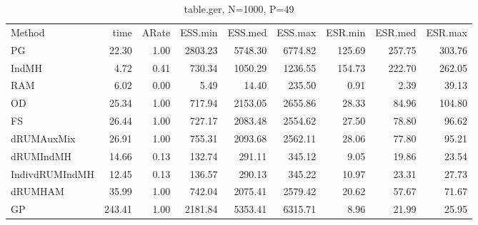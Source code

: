 \begin{table}
\label{tab:blogit-ger}
\begin{tabular}{l r r r r r r r r } 
          Method  &     time &    ARate &  ESS.min &  ESS.med &  ESS.max &  ESR.min &  ESR.med &  ESR.max \\ 
              PG  &    22.30 &     1.00 &  2803.23 &  5748.30 &  6774.82 &   125.69 &   257.75 &   303.76 \\ 
           IndMH  &     4.72 &     0.41 &   730.34 &  1050.29 &  1236.55 &   154.73 &   222.70 &   262.05 \\ 
             RAM  &     6.02 &     0.00 &     5.49 &    14.40 &   235.50 &     0.91 &     2.39 &    39.13 \\ 
              OD  &    25.34 &     1.00 &   717.94 &  2153.05 &  2655.86 &    28.33 &    84.96 &   104.80 \\ 
              FS  &    26.44 &     1.00 &   727.17 &  2083.48 &  2554.62 &    27.50 &    78.80 &    96.62 \\ 
      dRUMAuxMix  &    26.91 &     1.00 &   755.31 &  2093.68 &  2562.11 &    28.06 &    77.80 &    95.21 \\ 
       dRUMIndMH  &    14.66 &     0.13 &   132.74 &   291.11 &   345.12 &     9.05 &    19.86 &    23.54 \\ 
  IndivdRUMIndMH  &    12.45 &     0.13 &   136.57 &   290.13 &   345.22 &    10.97 &    23.31 &    27.73 \\ 
         dRUMHAM  &    35.99 &     1.00 &   742.04 &  2075.41 &  2579.42 &    20.62 &    57.67 &    71.67 \\ 
              GP  &   243.41 &     1.00 &  2181.84 &  5353.41 &  6315.71 &     8.96 &    21.99 &    25.95
 \end{tabular}
\caption{table.ger, N=1000, P=49}
\end{table}

